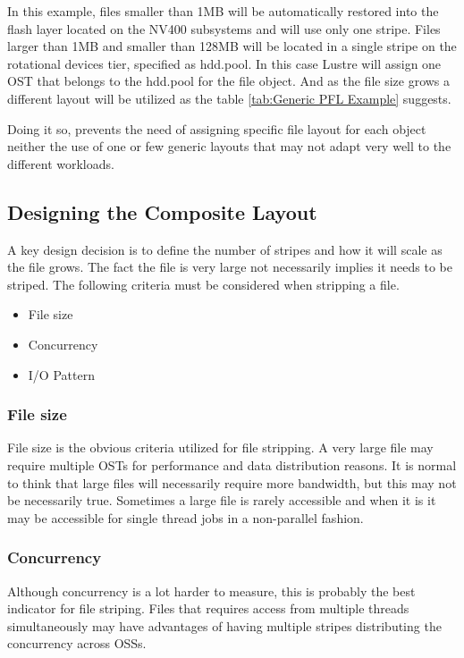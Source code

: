 \documentclass{article}
\begin{document}
In this example, files smaller than 1MB will be automatically restored into the flash layer located on the NV400 subsystems and will use only one stripe. Files larger than 1MB and smaller than 128MB will be located in a single stripe on the rotational devices tier, specified as hdd.pool. In this case Lustre will assign one OST that belongs to the hdd.pool for the file object. And as the file size grows a different layout will be utilized as the table \ref{tab:Generic PFL Example} suggests.

Doing it so, prevents the need of assigning specific file layout for each object neither the use of one or few generic layouts that may not adapt very well to the different workloads.

\subsection{Designing the Composite Layout}
A key design decision is to define the number of stripes and how it will scale as the file grows. The fact the file is very large not necessarily implies it needs to be striped. The following criteria must be considered when stripping a file.
\begin{itemize}
    \item File size
    \item Concurrency
    \item I/O Pattern
\end{itemize}

\subsubsection{File size}
File size is the obvious criteria utilized for file stripping. A very large file may require multiple OSTs for performance and data distribution reasons. It is normal to think that large files will necessarily require more bandwidth, but this may not be necessarily true. Sometimes a large file is rarely accessible and when it is it may be accessible for single thread jobs in a non-parallel fashion.

\subsubsection{Concurrency}
Although concurrency is a lot harder to measure, this is probably the best indicator for file striping. Files that requires access from multiple threads simultaneously may have advantages of having multiple stripes distributing the concurrency across OSSs. 
\end{document}
